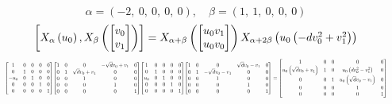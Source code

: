 \documentclass[11pt]{article}
\theoremstyle{definition}
\begin{document}
\[
\alpha = \left( -2, \  0, \  0, \  0, \  0\right), \quad \beta = \left( 1, \  1, \  0, \  0, \  0\right)
\]
\[
\scaletoalign{\textwidth}{\left[ X_{\alpha}\left(u_{0}\right), X_{\beta}\left(\left[\begin{matrix}v_{0}\\v_{1}\end{matrix}\right]\right) \right] = X_{\alpha + \beta}\left(\left[\begin{matrix}u_{0} v_{1}\\u_{0} v_{0}\end{matrix}\right]\right) X_{\alpha + 2\beta}\left(u_{0} \left(- d v_{0}^{2} + v_{1}^{2}\right)\right)}
\]
\[
\scaletoalign{\textwidth}{{\left[\begin{matrix}1 & 0 & 0 & 0 & 0\\0 & 1 & 0 & 0 & 0\\- u_{0} & 0 & 1 & 0 & 0\\0 & 0 & 0 & 1 & 0\\0 & 0 & 0 & 0 & 1\end{matrix}\right]} {\left[\begin{matrix}1 & 0 & 0 & - \sqrt{d} v_{0} + v_{1} & 0\\0 & 1 & \sqrt{d} v_{0} + v_{1} & 0 & 0\\0 & 0 & 1 & 0 & 0\\0 & 0 & 0 & 1 & 0\\0 & 0 & 0 & 0 & 1\end{matrix}\right]} {\left[\begin{matrix}1 & 0 & 0 & 0 & 0\\0 & 1 & 0 & 0 & 0\\u_{0} & 0 & 1 & 0 & 0\\0 & 0 & 0 & 1 & 0\\0 & 0 & 0 & 0 & 1\end{matrix}\right]} {\left[\begin{matrix}1 & 0 & 0 & \sqrt{d} v_{0} - v_{1} & 0\\0 & 1 & - \sqrt{d} v_{0} - v_{1} & 0 & 0\\0 & 0 & 1 & 0 & 0\\0 & 0 & 0 & 1 & 0\\0 & 0 & 0 & 0 & 1\end{matrix}\right]} = {\left[\begin{matrix}1 & 0 & 0 & 0 & 0\\u_{0} \left(\sqrt{d} v_{0} + v_{1}\right) & 1 & 0 & u_{0} \left(d v_{0}^{2} - v_{1}^{2}\right) & 0\\0 & 0 & 1 & u_{0} \left(\sqrt{d} v_{0} - v_{1}\right) & 0\\0 & 0 & 0 & 1 & 0\\0 & 0 & 0 & 0 & 1\end{matrix}\right]}}
\]
\end{document}

